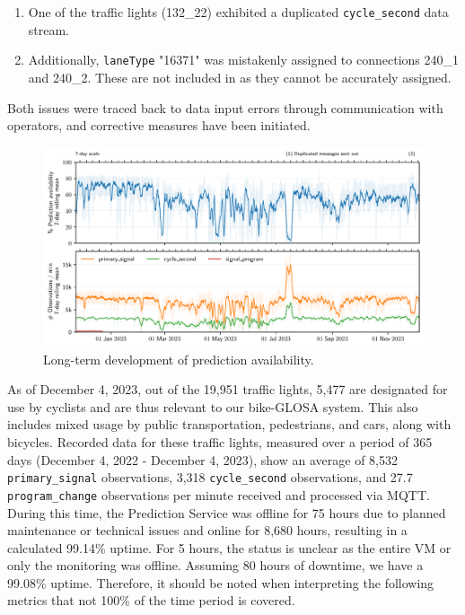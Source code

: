 \begin{enumerate}
    \item One of the traffic lights (132\_22) exhibited a duplicated \texttt{cycle\_second} data stream.
    \item Additionally, \texttt{laneType} "16371" was mistakenly assigned to connections 240\_1 and 240\_2. These are not included in  as they cannot be accurately assigned.
\end{enumerate}

Both issues were traced back to data input errors through communication with operators, and corrective measures have been initiated.

\begin{figure}[t]
    \centering
    \includegraphics[width=\linewidth]{images/monitoring-availability.pdf}
    \caption{Long-term development of prediction availability.}\label{fig:monitoring-availability}
\end{figure}

As of December 4, 2023, out of the 19,951 traffic lights, 5,477 are designated for use by cyclists and are thus relevant to our bike-GLOSA system. This also includes mixed usage by public transportation, pedestrians, and cars, along with bicycles. Recorded data for these traffic lights, measured over a period of 365 days (December 4, 2022 - December 4, 2023), show an average of 8,532 \texttt{primary\_signal} observations, 3,318 \texttt{cycle\_second} observations, and 27.7 \texttt{program\_change} observations per minute received and processed via MQTT. During this time, the Prediction Service was offline for 75 hours due to planned maintenance or technical issues and online for 8,680 hours, resulting in a calculated 99.14\% uptime. For 5 hours, the status is unclear as the entire VM or only the monitoring was offline. Assuming 80 hours of downtime, we have a 99.08\% uptime. Therefore, it should be noted when interpreting the following metrics that not 100\% of the time period is covered.

